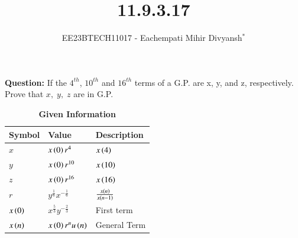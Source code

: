 \documentclass[journal,12pt,twocolumn]{IEEEtran}
\theoremstyle{remark}
\begin{document}

\vspace{3cm}

\title{11.9.3.17}
\author{EE23BTECH11017 - Eachempati Mihir Divyansh$^{*}$%
}
\maketitle
\newpage
\bigskip

\renewcommand{\thefigure}{\theenumi}
\renewcommand{\thetable}{\theenumi}

\textbf{Question: }
If the $4^{th}$, $10^{th}$ and $16^{th}$ terms of a G.P. are x, y, and z, respectively. Prove that $x,\; y,\; z$ are in G.P.


\begin{table}[h]
    \renewcommand\thetable{1}
    \centering
        \caption{\textbf{Given Information}}
    \begin{tabular}{|m{2cm}|m{2cm}|m{2cm}|}
    \hline
    \textbf{Symbol} & \textbf{Value} & \textbf{Description}\\ [1ex]
    \hline
        $x$ & $x\left(0\right)r^4$ & $x\left(4\right)$ \\ [1ex]
    \hline
        $y$ & $x\left(0\right)r^{10}$ & $x\left(10\right)$\\ [1ex]
    \hline
        $z$ & $x\left(0\right)r^{16}$ & $x\left(16\right)$\\ [1ex]
    \hline
        $r$ & $y^{\frac{1}{6}}x^{-\frac{1}{6}}$ & $\frac{x\left(n\right)}{x\left(n-1\right)}$\\[1ex]
    \hline \vspace{0.1cm}
        $x\left(0\right)$ & $x^{\frac{5}{3}}y^{-\frac{2}{3}}$ & First term \\[1ex]
    \hline
        $x\left(n\right)$ & $x\left(0\right)r^nu\left(n\right)$ & General Term \\ [1ex]
    \hline
    \end{tabular}\label{Table 1}
\end{table} 

\solution
\end{document}
